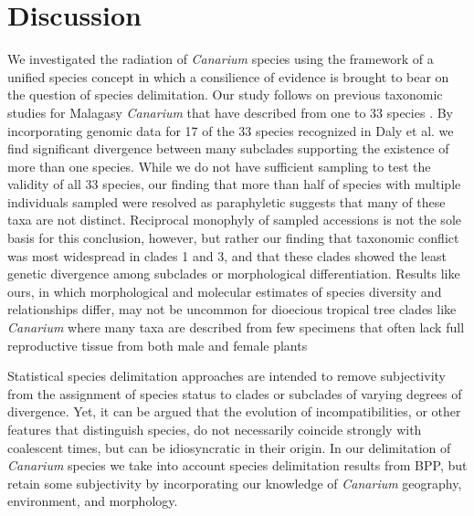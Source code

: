 \documentclass[10pt,letterpaper]{article}
\begin{document}
\section*{Discussion}
We investigated the radiation of \emph{Canarium} species using the framework of a unified species concept \cite{de_queiroz_species_2007} in which a consilience of evidence is brought to bear on the question of species delimitation. Our study follows on previous taxonomic studies for Malagasy \emph{Canarium} that have described from one to 33 species \cite{leenhouts_revision_1959,daly_revision_2015}. By incorporating genomic data for 17 of the 33 species recognized in Daly et al. \cite{daly_revision_2015} we find significant divergence between many subclades supporting the existence of more than one species. While we do not have sufficient sampling to test the validity of all 33 species, our finding that more than half of species with multiple individuals sampled were resolved as paraphyletic suggests that many of these taxa are not distinct. Reciprocal monophyly of sampled accessions is not the sole basis for this conclusion, however, but rather our finding that taxonomic conflict was most widespread in clades 1 and 3, and that these clades showed the least genetic divergence among subclades or morphological differentiation. %
Results like ours, in which morphological and molecular estimates of species diversity and relationships differ, may not be uncommon for dioecious tropical tree clades like \emph{Canarium} where many taxa are described from few specimens that often lack full reproductive tissue from both male and female plants

Statistical species delimitation approaches are intended to remove subjectivity from the assignment of species status to clades or subclades of varying degrees of divergence. Yet, it can be argued that the evolution of incompatibilities, or other features that distinguish species, do not necessarily coincide strongly with coalescent times, but can be idiosyncratic in their origin. In our delimitation of \emph{Canarium} species we take into account species delimitation results from BPP, but retain some subjectivity by incorporating our knowledge of \emph{Canarium} geography, environment, and morphology. 
\end{document}
